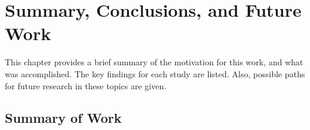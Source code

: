 \chapter{Summary, Conclusions, and Future Work}{
  \label{ch:Conclusions}
  This chapter provides a brief summary of the motivation for this work, and what was accomplished.
  The key findings for each study are listed.
  Also, possible paths for future research in these topics are given.

  \section{Summary of Work}{\label{sec:Summary of Work}
}}
